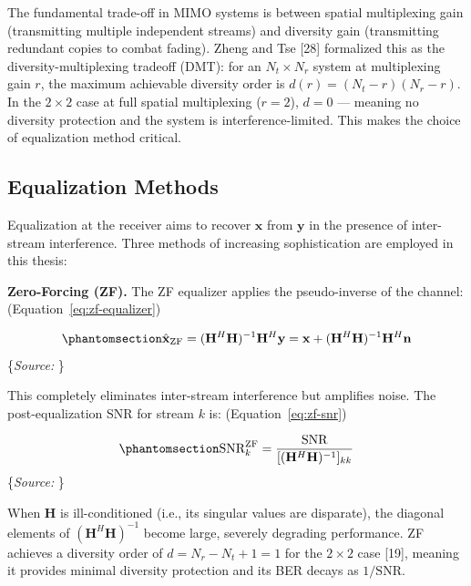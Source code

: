 \documentclass[
  english,
  12pt,
  12pt,
  a4paper,
  oneside]{report}
\begin{document}
The fundamental trade-off in MIMO systems is between spatial multiplexing gain (transmitting multiple independent streams) and diversity gain (transmitting redundant copies to combat fading). Zheng and Tse {[}28{]} formalized this as the diversity-multiplexing tradeoff (DMT): for an \(N_t \times N_r\) system at multiplexing gain \(r\), the maximum achievable diversity order is \(d(r) = (N_t - r)(N_r - r)\). In the \(2 \times 2\) case at full spatial multiplexing (\(r = 2\)), \(d = 0\) --- meaning no diversity protection and the system is interference-limited. This makes the choice of equalization method critical.

\subsection{Equalization Methods}\label{sec:equalization-methods}

Equalization at the receiver aims to recover \(\mathbf{x}\) from \(\mathbf{y}\) in the presence of inter-stream interference. Three methods of increasing sophistication are employed in this thesis:

\textbf{Zero-Forcing (ZF).} The ZF equalizer applies the pseudo-inverse of the channel: (Equation~\ref{eq:zf-equalizer})

\begin{equation}\protect\phantomsection\label{eq:zf-equalizer}{\hat{\mathbf{x}}_{\text{ZF}} = (\mathbf{H}^H\mathbf{H})^{-1}\mathbf{H}^H\mathbf{y} = \mathbf{x} + (\mathbf{H}^H\mathbf{H})^{-1}\mathbf{H}^H\mathbf{n}
}\end{equation} \footnotesize\{\textit{Source: \1}\}\normalsize

This completely eliminates inter-stream interference but amplifies noise. The post-equalization SNR for stream \(k\) is: (Equation~\ref{eq:zf-snr})

\begin{equation}\protect\phantomsection\label{eq:zf-snr}{\text{SNR}_k^{\text{ZF}} = \frac{\text{SNR}}{[(\mathbf{H}^H\mathbf{H})^{-1}]_{kk}}
}\end{equation} \footnotesize\{\textit{Source: \1}\}\normalsize

When \(\mathbf{H}\) is ill-conditioned (i.e., its singular values are disparate), the diagonal elements of \((\mathbf{H}^H\mathbf{H})^{-1}\) become large, severely degrading performance. ZF achieves a diversity order of \(d = N_r - N_t + 1 = 1\) for the \(2 \times 2\) case {[}19{]}, meaning it provides minimal diversity protection and its BER decays as \(1/\text{SNR}\).
\end{document}
